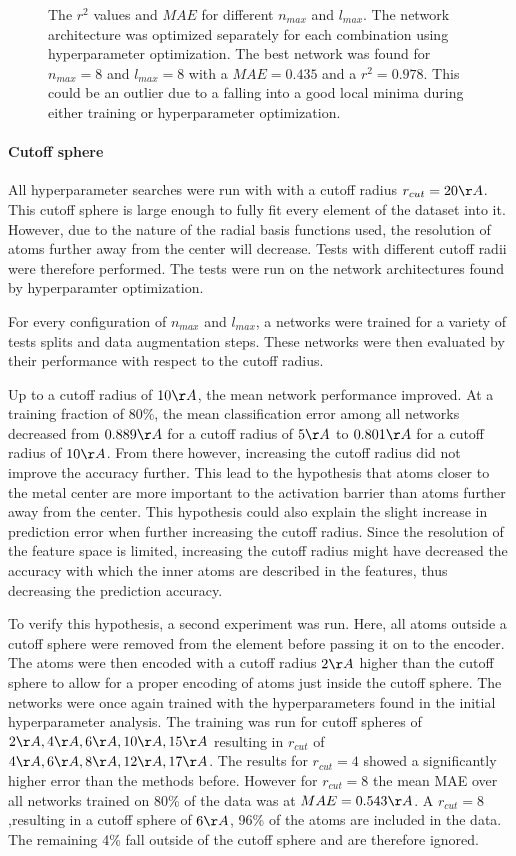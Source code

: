 \begin{figure}[!htb]
  \endminipage
  \caption{
  The $r^2$ values and $MAE$ for different $n_{max}$ and $l_{max}$.
  The network architecture was optimized separately for each combination using hyperparameter optimization.
  The best network was found for $n_{max}=8$ and $l_{max}=8$ with a $MAE=0.435$ and a $r^2 = 0.978$.
  This could be an outlier due to a falling into a good local minima during either training or hyperparameter optimization.
  }
  \label{fig:snap_hyperparameter}
\end{figure}

\paragraph{Cutoff sphere}
All hyperparameter searches were run with with a cutoff radius $r_{cut} = 20 \AA$.
This cutoff sphere is large enough to fully fit every element of the dataset into it.
However, due to the nature of the radial basis functions used, the resolution of atoms 
further away from the center will decrease.
Tests with different cutoff radii were therefore performed.
The tests were run on the network architectures found by hyperparamter optimization.

For every configuration of $n_{max}$ and $l_{max}$, a networks were trained for a variety 
of tests splits and data augmentation steps.
These networks were then evaluated by their performance with respect to the cutoff radius.

Up to a cutoff radius of $10 \AA$, the mean network performance improved.
At a training fraction of 80\%, the mean classification error among 
all networks decreased from $0.889 \AA$ for a cutoff radius of $5 \AA$ to 
$0.801 \AA$ for a cutoff radius of $10 \AA$.
From there however, increasing the cutoff radius did not improve the accuracy further.
This lead to the hypothesis that atoms closer to the metal center are more important to the activation barrier than atoms further away from the center.
This hypothesis could also explain the slight increase in prediction error when further increasing the cutoff radius.
Since the resolution of the feature space is limited, increasing the cutoff radius might have decreased the accuracy 
with which the inner atoms are described in the features, thus decreasing the prediction accuracy.

To verify this hypothesis, a second experiment was run.
Here, all atoms outside a cutoff sphere were removed from the element before passing it on to the encoder.
The atoms were then encoded with a cutoff radius $2 \AA$ higher than the cutoff sphere to allow for a proper 
encoding of atoms just inside the cutoff sphere.
The networks were once again trained with the hyperparameters found in the initial hyperparameter analysis.
The training was run for cutoff spheres of $2\AA, 4\AA, 6\AA, 10\AA, 15\AA$ resulting in $r_{cut}$ 
of $4\AA, 6\AA, 8\AA, 12\AA, 17\AA$.
The results for $r_{cut}=4$ showed a significantly higher error than the methods before.
However for $r_{cut}=8$ the mean MAE over all networks trained on 80\% of the data was at $MAE = 0.543 \AA$. 
A $r_{cut} = 8$,resulting in a cutoff sphere of $6 \AA$, 96\% of the atoms are included in the data. 
The remaining 4\% fall outside of the cutoff sphere and are therefore ignored. 

